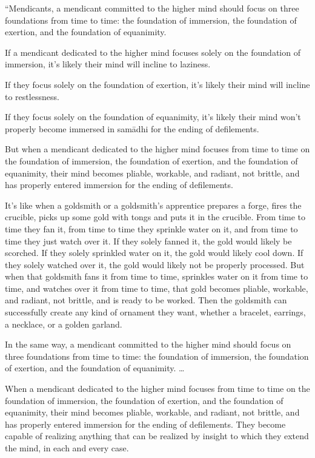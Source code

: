\documentclass[12pt,openany]{book}%
\begin{document}
“Mendicants, a mendicant committed to the higher mind should focus on three foundations from time to time: the foundation of immersion, the foundation of exertion, and the foundation of equanimity. 

If a mendicant dedicated to the higher mind focuses solely on the foundation of immersion, it’s likely their mind will incline to laziness. 

If they focus solely on the foundation of exertion, it’s likely their mind will incline to restlessness. 

If they focus solely on the foundation of equanimity, it’s likely their mind won’t properly become immersed in \textsanskrit{samādhi} for the ending of defilements. 

But when a mendicant dedicated to the higher mind focuses from time to time on the foundation of immersion, the foundation of exertion, and the foundation of equanimity, their mind becomes pliable, workable, and radiant, not brittle, and has properly entered immersion for the ending of defilements. 

It’s like when a goldsmith or a goldsmith’s apprentice prepares a forge, fires the crucible, picks up some gold with tongs and puts it in the crucible. From time to time they fan it, from time to time they sprinkle water on it, and from time to time they just watch over it. If they solely fanned it, the gold would likely be scorched. If they solely sprinkled water on it, the gold would likely cool down. If they solely watched over it, the gold would likely not be properly processed. But when that goldsmith fans it from time to time, sprinkles water on it from time to time, and watches over it from time to time, that gold becomes pliable, workable, and radiant, not brittle, and is ready to be worked. Then the goldsmith can successfully create any kind of ornament they want, whether a bracelet, earrings, a necklace, or a golden garland. 

In the same way, a mendicant committed to the higher mind should focus on three foundations from time to time: the foundation of immersion, the foundation of exertion, and the foundation of equanimity. … 

When a mendicant dedicated to the higher mind focuses from time to time on the foundation of immersion, the foundation of exertion, and the foundation of equanimity, their mind becomes pliable, workable, and radiant, not brittle, and has properly entered immersion for the ending of defilements. They become capable of realizing anything that can be realized by insight to which they extend the mind, in each and every case. 
\end{document}
